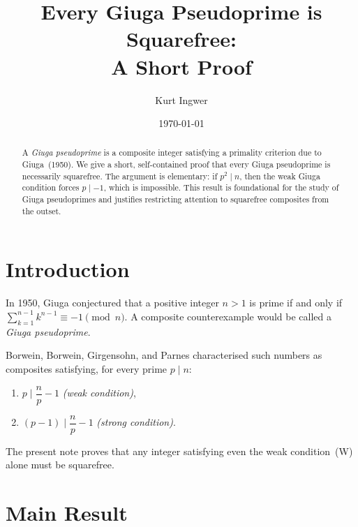 \documentclass[12pt,a4paper]{amsart}
\theoremstyle{definition}
\begin{document}

\title{Every Giuga Pseudoprime is Squarefree:\\ A Short Proof}

\author{Kurt Ingwer}
\address{Specialist Mathematics Project, Version Build 44}
\date{\today}

\begin{abstract}
A \emph{Giuga pseudoprime} is a composite integer satisfying a primality criterion
due to Giuga~(1950).  We give a short, self-contained proof that every Giuga
pseudoprime is necessarily squarefree.  The argument is elementary: if $p^2 \mid n$,
then the weak Giuga condition forces $p \mid -1$, which is impossible.  This result
is foundational for the study of Giuga pseudoprimes and justifies restricting
attention to squarefree composites from the outset.
\end{abstract}

\maketitle

\section{Introduction}

In 1950, Giuga \cite{Giuga1950} conjectured that a positive integer $n > 1$ is prime
if and only if $\sum_{k=1}^{n-1} k^{n-1} \equiv -1 \pmod{n}$.
A composite counterexample would be called a \emph{Giuga pseudoprime}.

Borwein, Borwein, Girgensohn, and Parnes \cite{Borwein1996} characterised such
numbers as composites satisfying, for every prime $p \mid n$:
\begin{enumerate}
  \item[\textup{(W)}] $p \mid \dfrac{n}{p} - 1$ \quad \emph{(weak condition)},
  \item[\textup{(S)}] $(p-1) \mid \dfrac{n}{p} - 1$ \quad \emph{(strong condition)}.
\end{enumerate}

The present note proves that any integer satisfying even the weak condition~(W) alone
must be squarefree.

\section{Main Result}
\end{document}
